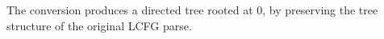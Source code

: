 \documentclass[11pt,letterpaper]{article}
\begin{document}


The conversion produces a directed tree rooted at $0$, by preserving the tree structure of the original LCFG parse.































\end{document}
